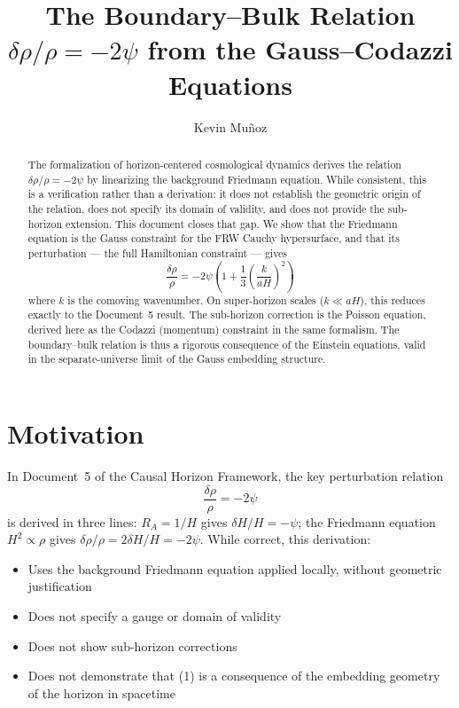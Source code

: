 \documentclass[12pt,a4paper]{article}
\title{The Boundary--Bulk Relation $\delta\rho/\rho = -2\psi$ from the Gauss--Codazzi Equations}
\author{Kevin Mu\~noz}
\date{}
\begin{document}
\maketitle

\begin{abstract}
The formalization of horizon-centered cosmological dynamics derives the relation $\delta\rho/\rho = -2\psi$ by linearizing the background Friedmann equation. While consistent, this is a verification rather than a derivation: it does not establish the geometric origin of the relation, does not specify its domain of validity, and does not provide the sub-horizon extension. This document closes that gap. We show that the Friedmann equation is the Gauss constraint for the FRW Cauchy hypersurface, and that its perturbation --- the full Hamiltonian constraint --- gives
\[
\frac{\delta\rho}{\rho} = -2\psi\!\left(1 + \frac{1}{3}\left(\frac{k}{aH}\right)^2\right)
\]
where $k$ is the comoving wavenumber. On super-horizon scales ($k \ll aH$), this reduces exactly to the Document~5 result. The sub-horizon correction is the Poisson equation, derived here as the Codazzi (momentum) constraint in the same formalism. The boundary--bulk relation is thus a rigorous consequence of the Einstein equations, valid in the separate-universe limit of the Gauss embedding structure.
\end{abstract}

\section{Motivation}

In Document~5 of the Causal Horizon Framework, the key perturbation relation
\begin{equation}
\frac{\delta\rho}{\rho} = -2\psi \tag{1}
\end{equation}
is derived in three lines: $R_A = 1/H$ gives $\delta H/H = -\psi$; the Friedmann equation $H^2 \propto \rho$ gives $\delta\rho/\rho = 2\delta H/H = -2\psi$. While correct, this derivation:

\begin{itemize}
  \item Uses the background Friedmann equation applied locally, without geometric justification
  \item Does not specify a gauge or domain of validity
  \item Does not show sub-horizon corrections
  \item Does not demonstrate that (1) is a consequence of the embedding geometry of the horizon in spacetime
\end{itemize}
\end{document}
